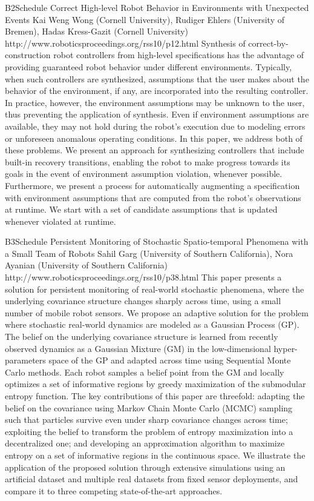 \begin{spacing}{1.0}
\descriptionPaper
{B2}{Schedule}
{
Correct High-level Robot Behavior in Environments with Unexpected Events
}
{
Kai Weng Wong (Cornell University), Rudiger Ehlers (University of Bremen), Hadas Kress-Gazit (Cornell University)
}
{
http://www.roboticsproceedings.org/rss10/p12.html
}
{
Synthesis of correct-by-construction robot controllers from high-level specifications has the advantage of providing guaranteed robot behavior under different environments. Typically, when such controllers are synthesized, assumptions that the user makes about the behavior of the environment, if any, are incorporated into the resulting controller. In practice, however, the environment assumptions may be unknown to the user, thus preventing the application of synthesis. Even if environment assumptions are available, they may not hold during the robot's execution due to modeling errors or unforeseen anomalous operating conditions. In this paper, we address both of these problems. We present an approach for synthesizing controllers that include built-in recovery transitions, enabling the robot to make progress towards its goals in the event of environment assumption violation, whenever possible. Furthermore, we present a process for automatically augmenting a specification with environment assumptions that are computed from the robot's observations at runtime. We start with a set of candidate assumptions that is updated whenever violated at runtime.
}


\descriptionPaper
{B3}{Schedule}
{
Persistent Monitoring of Stochastic Spatio-temporal Phenomena with a Small Team of Robots
}
{
Sahil Garg (University of Southern California), Nora Ayanian (University of Southern California)
}
{
http://www.roboticsproceedings.org/rss10/p38.html
}
{
This paper presents a solution for persistent monitoring of real-world stochastic phenomena, where the underlying covariance structure changes sharply across time, using a small number of mobile robot sensors. We propose an adaptive solution for the problem where stochastic real-world dynamics are modeled as a Gaussian Process (GP). The belief on the underlying covariance structure is learned from recently observed dynamics as a Gaussian Mixture (GM) in the low-dimensional hyper-parameters space of the GP and adapted across time using Sequential Monte Carlo methods. Each robot samples a belief point from the GM and locally optimizes a set of informative regions by greedy maximization of the submodular entropy function. The key contributions of this paper are threefold: adapting the belief on the covariance using Markov Chain Monte Carlo (MCMC) sampling such that particles survive even under sharp covariance changes across time; exploiting the belief to transform the problem of entropy maximization into a decentralized one; and developing an approximation algorithm to maximize entropy on a set of informative regions in the continuous space. We illustrate the application of the proposed solution through extensive simulations using an artificial dataset and multiple real datasets from fixed sensor deployments, and compare it to three competing state-of-the-art approaches.
}




\end{spacing}
